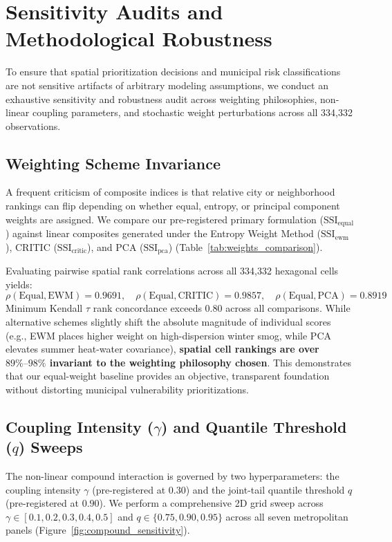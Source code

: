 \section{Sensitivity Audits and Methodological Robustness}
\label{sec:sensitivity}

To ensure that spatial prioritization decisions and municipal risk classifications are not sensitive artifacts of arbitrary modeling assumptions, we conduct an exhaustive sensitivity and robustness audit across weighting philosophies, non-linear coupling parameters, and stochastic weight perturbations across all 334,332 observations.

\subsection{Weighting Scheme Invariance}
A frequent criticism of composite indices is that relative city or neighborhood rankings can flip depending on whether equal, entropy, or principal component weights are assigned. We compare our pre-registered primary formulation ($\text{SSI}_{\text{equal}}$) against linear composites generated under the Entropy Weight Method ($\text{SSI}_{\text{ewm}}$), CRITIC ($\text{SSI}_{\text{critic}}$), and PCA ($\text{SSI}_{\text{pca}}$) (Table~\ref{tab:weights_comparison}).

Evaluating pairwise spatial rank correlations across all 334,332 hexagonal cells yields:
\begin{equation}
    \rho(\text{Equal}, \text{EWM}) = 0.9691, \quad \rho(\text{Equal}, \text{CRITIC}) = 0.9857, \quad \rho(\text{Equal}, \text{PCA}) = 0.8919
\end{equation}
Minimum Kendall $\tau$ rank concordance exceeds $0.80$ across all comparisons. While alternative schemes slightly shift the absolute magnitude of individual scores (e.g., EWM places higher weight on high-dispersion winter smog, while PCA elevates summer heat-water covariance), \textbf{spatial cell rankings are over $89\%\text{--}98\%$ invariant to the weighting philosophy chosen}. This demonstrates that our equal-weight baseline provides an objective, transparent foundation without distorting municipal vulnerability prioritizations.

\subsection{Coupling Intensity \texorpdfstring{($\gamma$)}{(gamma)} and Quantile Threshold \texorpdfstring{($q$)}{(q)} Sweeps}
The non-linear compound interaction is governed by two hyperparameters: the coupling intensity $\gamma$ (pre-registered at $0.30$) and the joint-tail quantile threshold $q$ (pre-registered at $0.90$). We perform a comprehensive 2D grid sweep across $\gamma \in [0.1, 0.2, 0.3, 0.4, 0.5]$ and $q \in \{0.75, 0.90, 0.95\}$ across all seven metropolitan panels (Figure~\ref{fig:compound_sensitivity}).

